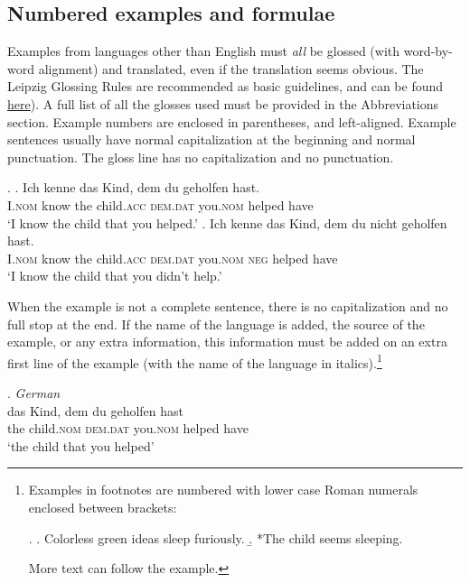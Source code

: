 \documentclass[charis,linguex]{glossa}
\begin{document}
\subsection{Numbered examples and formulae}

Examples from languages other than English must \emph{all} be glossed (with word-by-word alignment) and translated, even if the translation seems obvious. The Leipzig Glossing Rules are recommended as basic guidelines, and can be found \href{http://www.eva.mpg.de/lingua/resources/glossing-rules.php}{here}). A full list of all the glosses used must be provided in the Abbreviations section. Example numbers are enclosed in parentheses, and left-aligned. Example sentences usually have normal capitalization at the beginning and normal punctuation. The gloss line has no capitalization and no punctuation. 

\ex. \ag. Ich   kenne das Kind, dem du geholfen hast.\\
I.\textsc{nom} know the child.\textsc{acc} \textsc{dem.dat} you.\textsc{nom} helped have\\
\glt `I know the child that you helped.'
\bg. Ich kenne das Kind, dem du nicht geholfen hast. \\
I.\textsc{nom} know  the child.\textsc{acc} \textsc{dem.dat} you.\textsc{nom} \textsc{neg} helped   have\\
\glt `I know the child that you didn’t help.’

When the example is not a complete sentence, there is no capitalization and no full stop at the end. If the name of the language is added, the source of the example, or any extra information, this information must be added on an extra first line of the example (with the name of the language in italics).\footnote{Examples in footnotes are numbered with lower case Roman numerals enclosed between brackets:

\ex.
\a. Colorless green ideas sleep furiously.
\b. *The child seems sleeping.

More text can follow the example.}

\ex. \textit{German} \citep{coetsem:2000}\\ %
\gll das Kind, dem du geholfen hast\\  %
the child.\textsc{nom} \textsc{dem.dat} you.\textsc{nom}  helped have\\ %
\glt `the child that you helped' %
\end{document}
